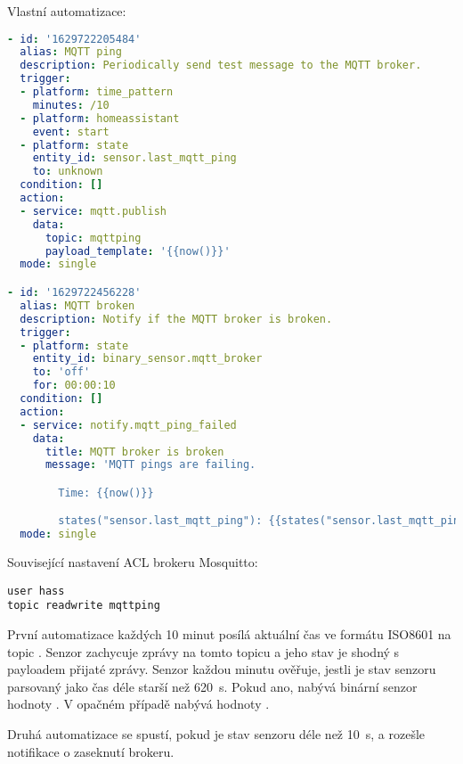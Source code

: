 Vlastní automatizace:
\begin{lstlisting}[language=yaml, style=numbers]
- id: '1629722205484'
  alias: MQTT ping
  description: Periodically send test message to the MQTT broker.
  trigger:
  - platform: time_pattern
    minutes: /10
  - platform: homeassistant
    event: start
  - platform: state
    entity_id: sensor.last_mqtt_ping
    to: unknown
  condition: []
  action:
  - service: mqtt.publish
    data:
      topic: mqttping
      payload_template: '{{now()}}'
  mode: single

- id: '1629722456228'
  alias: MQTT broken
  description: Notify if the MQTT broker is broken.
  trigger:
  - platform: state
    entity_id: binary_sensor.mqtt_broker
    to: 'off'
    for: 00:00:10
  condition: []
  action:
  - service: notify.mqtt_ping_failed
    data:
      title: MQTT broker is broken
      message: 'MQTT pings are failing.

        Time: {{now()}}

        states("sensor.last_mqtt_ping"): {{states("sensor.last_mqtt_ping")}}'
  mode: single
\end{lstlisting}


Související nastavení ACL brokeru Mosquitto:
\begin{lstlisting}
user hass
topic readwrite mqttping
\end{lstlisting}


První automatizace každých 10 minut posílá aktuální čas ve formátu ISO8601 na
topic . Senzor  zachycuje
zprávy na tomto topicu a jeho stav je shodný s payloadem přijaté zprávy.
Senzor  každou minutu ověřuje, jestli je
stav senzoru  parsovaný jako čas déle starší
než \SI{620}{\second}. Pokud ano, nabývá binární senzor hodnoty .
V opačném případě nabývá hodnoty .

Druhá automatizace se spustí, pokud je stav senzoru
  déle než \SI{10}{\second},
a rozešle notifikace o zaseknutí brokeru.
